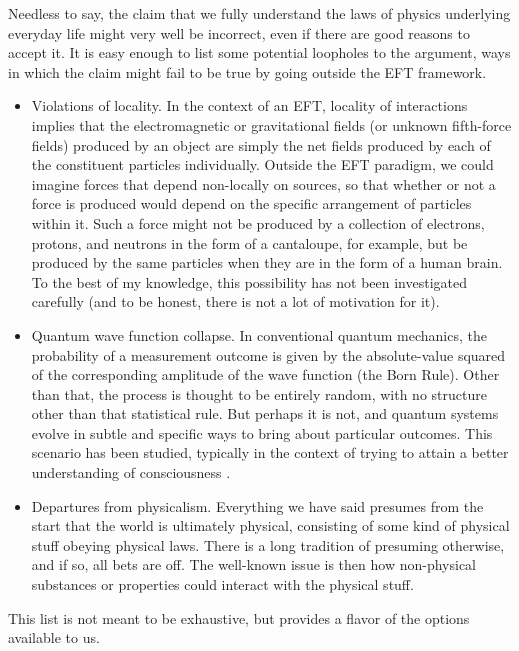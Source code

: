 \documentclass[12pt,letterpaper]{article}
\begin{document}
Needless to say, the claim that we fully understand the laws of physics underlying everyday life might very well be incorrect, even if there are good reasons to accept it.
It is easy enough to list some potential loopholes to the argument, ways in which the claim might fail to be true by going outside the EFT framework.
\begin{itemize}
\item Violations of locality.
In the context of an EFT, locality of interactions implies that the electromagnetic or gravitational fields (or unknown fifth-force fields) produced by an object are simply the net fields produced by each of the constituent particles individually.
Outside the EFT paradigm, we could imagine forces that depend non-locally on sources, so that whether or not a force is produced would depend on the specific arrangement of particles within it.
Such a force might not be produced by a collection of electrons, protons, and neutrons in the form of a cantaloupe, for example, but be produced by the same particles when they are in the form of a human brain.
To the best of my knowledge, this possibility has not been investigated carefully (and to be honest, there is not a lot of motivation for it).
\item Quantum wave function collapse.
In conventional quantum mechanics, the probability of a measurement outcome is given by the absolute-value squared of the corresponding amplitude of the wave function (the Born Rule).
Other than that, the process is thought to be entirely random, with no structure other than that statistical rule.
But perhaps it is not, and quantum systems evolve in subtle and specific ways to bring about particular outcomes.
This scenario has been studied, typically in the context of trying to attain a better understanding of consciousness \citep{penrose1989emperor,Chalmers2014ConsciousnessAT}.
\item Departures from physicalism.
Everything we have said presumes from the start that the world is ultimately physical, consisting of some kind of physical stuff obeying physical laws.
There is a long tradition of presuming otherwise, and if so, all bets are off.
The well-known issue is then how non-physical substances or properties could interact with the physical stuff.
\end{itemize}
This list is not meant to be exhaustive, but provides a flavor of the options available to us.
\end{document}
